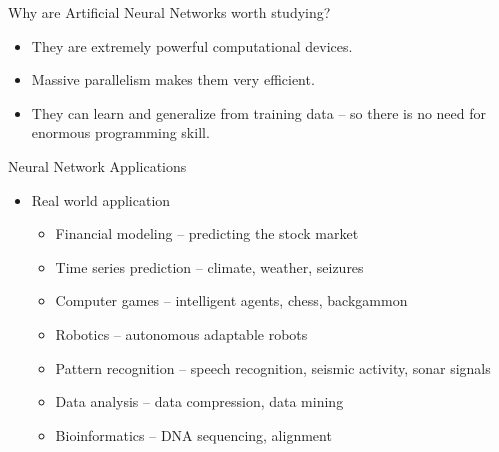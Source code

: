 \begin{frame}{Why are Artificial Neural Networks worth studying?}
\begin{itemize}
\item They are extremely powerful computational devices.
\item Massive parallelism makes them very efficient.
\item They can learn and generalize from training data -- so there is no need for enormous programming skill.
\end{itemize}
\end{frame}

\begin{frame}{Neural Network Applications}
\begin{itemize}
\item Real world application
\begin{itemize}
\item Financial modeling -- predicting the stock market
\item Time series prediction -- climate, weather, seizures
\item Computer games -- intelligent agents, chess, backgammon
\item Robotics -- autonomous adaptable robots
\item Pattern recognition -- speech recognition, seismic activity, sonar signals
\item Data analysis -- data compression, data mining
\item Bioinformatics -- DNA sequencing, alignment
\end{itemize}
\end{itemize}
\end{frame}

